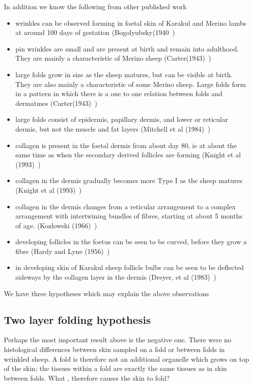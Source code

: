 \documentclass[titlepage]{article}  %
\begin{document}
In addition we know the following from other published work
\begin{itemize}
\item wrinkles can be observed forming in foetal skin of Karakul and Merino lambs at around 100 days of gestation (Bogolyubsky(1940~\cite{bogo:40})
\item pin wrinkles are small and are present at birth and remain into adulthood. They are mainly a characteristic of Merino sheep (Carter(1943)~\cite{cart:43})
\item large folds grow in size as the sheep matures, but can be visible at birth. They are also mainly a characteristic of some Merino sheep. Large folds form in a pattern in which there is a one to one relation between folds and dermatmes (Carter(1943)~\cite{cart:43})
\item large folds consist of epidermis, papillary dermis, and lower or reticular dermis, but not the muscle and fat layers (Mitchell et al (1984)~\cite{mitc:84})
\item collagen is present in the foetal dermis from about day 80, ie at about the same time as when the secondary derived follicles are forming (Knight et al (1993)~\cite{knig:93})
\item collagen in the dermis gradually becomes more Type I as the sheep matures (Knight et al (1993)~\cite{knig:93})
\item collagen in the dermis changes from a reticular arrangement to a complex arrangement with intertwining bundles of fibres, starting at about 5 months of age. (Kozlowski (1966)~\cite{kozl:66})
\item developing follicles in the foetus can be seen to be curved, before they grow a fibre (Hardy and Lyne (1956)~\cite{hard:56})
\item in developing skin of Karakul sheep follicle bulbs can be seen to be deflected sideways by the collagen layer in the dermis (Dreyer, et al (1983)~\cite{drey:83})
\end{itemize}

We have three hypotheses which may explain the above observations
\subsection{Two layer folding hypothesis}
Perhaps the most important result above is the negative one. There were no histological differences between skin sampled on a fold or between folds in wrinkled sheep. A fold is therefore not an additional organelle which grows on top of the skin; the tissues within a fold are exactly the same tissues as in skin between folds. What , therefore causes the skin to fold?
\end{document}
